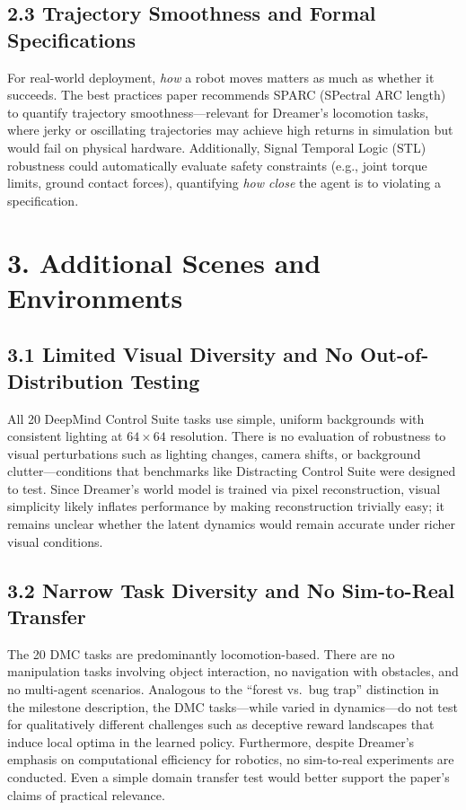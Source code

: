 \documentclass[11pt]{article}
\begin{document}
\subsection{2.3 Trajectory Smoothness and Formal Specifications}
For real-world deployment, \textit{how} a robot moves matters as much
as whether it succeeds. The best practices paper recommends SPARC
(SPectral ARC length) to quantify trajectory smoothness---relevant for Dreamer's
locomotion tasks, where jerky or oscillating trajectories may achieve
high returns in simulation but would fail on physical hardware.
Additionally, Signal Temporal Logic (STL) robustness could
automatically evaluate safety constraints (e.g., joint torque limits,
ground contact forces), quantifying \textit{how close} the agent is to
violating a specification.

\section{3. Additional Scenes and Environments}

\subsection{3.1 Limited Visual Diversity and No Out-of-Distribution Testing}
All 20 DeepMind Control Suite tasks use simple, uniform backgrounds
with consistent lighting at $64 \times 64$ resolution. There is no
evaluation of robustness to visual perturbations such as lighting changes,
camera shifts, or background clutter---conditions that benchmarks
like Distracting Control Suite were designed to test.
Since Dreamer's world model is trained via pixel reconstruction,
visual simplicity likely inflates performance by making reconstruction
trivially easy; it remains unclear whether the latent dynamics would
remain accurate under richer visual conditions.

\subsection{3.2 Narrow Task Diversity and No Sim-to-Real Transfer}
The 20 DMC tasks are predominantly locomotion-based. There are no
manipulation tasks involving object interaction, no navigation with
obstacles, and no multi-agent scenarios. Analogous to the ``forest
vs.\ bug trap'' distinction in the milestone description, the DMC
tasks---while varied in dynamics---do not test for qualitatively
different challenges such as deceptive reward landscapes that induce
local optima in
the learned policy. Furthermore, despite Dreamer's emphasis on
computational efficiency for robotics, no sim-to-real experiments
are conducted. Even a simple domain transfer test would better
support the paper's claims of practical relevance.
\end{document}
